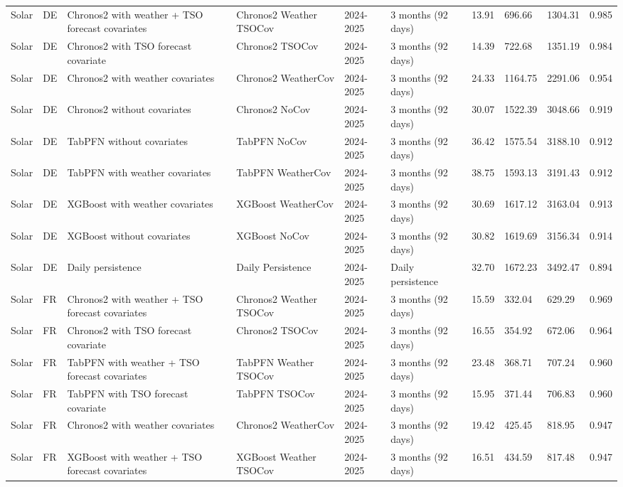\begin{longtable}{llllllllll}
Solar & DE & Chronos2 with weather + TSO forecast covariates & Chronos2 Weather TSOCov & 2024-2025 & 3 months (92 days) & 13.91 & 696.66 & 1304.31 & 0.985 \\
Solar & DE & Chronos2 with TSO forecast covariate & Chronos2 TSOCov & 2024-2025 & 3 months (92 days) & 14.39 & 722.68 & 1351.19 & 0.984 \\
Solar & DE & Chronos2 with weather covariates & Chronos2 WeatherCov & 2024-2025 & 3 months (92 days) & 24.33 & 1164.75 & 2291.06 & 0.954 \\
Solar & DE & Chronos2 without covariates & Chronos2 NoCov & 2024-2025 & 3 months (92 days) & 30.07 & 1522.39 & 3048.66 & 0.919 \\
Solar & DE & TabPFN without covariates & TabPFN NoCov & 2024-2025 & 3 months (92 days) & 36.42 & 1575.54 & 3188.10 & 0.912 \\
Solar & DE & TabPFN with weather covariates & TabPFN WeatherCov & 2024-2025 & 3 months (92 days) & 38.75 & 1593.13 & 3191.43 & 0.912 \\
Solar & DE & XGBoost with weather covariates & XGBoost WeatherCov & 2024-2025 & 3 months (92 days) & 30.69 & 1617.12 & 3163.04 & 0.913 \\
Solar & DE & XGBoost without covariates & XGBoost NoCov & 2024-2025 & 3 months (92 days) & 30.82 & 1619.69 & 3156.34 & 0.914 \\
Solar & DE & Daily persistence & Daily Persistence & 2024-2025 & Daily persistence & 32.70 & 1672.23 & 3492.47 & 0.894 \\
Solar & FR & Chronos2 with weather + TSO forecast covariates & Chronos2 Weather TSOCov & 2024-2025 & 3 months (92 days) & 15.59 & 332.04 & 629.29 & 0.969 \\
Solar & FR & Chronos2 with TSO forecast covariate & Chronos2 TSOCov & 2024-2025 & 3 months (92 days) & 16.55 & 354.92 & 672.06 & 0.964 \\
Solar & FR & TabPFN with weather + TSO forecast covariates & TabPFN Weather TSOCov & 2024-2025 & 3 months (92 days) & 23.48 & 368.71 & 707.24 & 0.960 \\
Solar & FR & TabPFN with TSO forecast covariate & TabPFN TSOCov & 2024-2025 & 3 months (92 days) & 15.95 & 371.44 & 706.83 & 0.960 \\
Solar & FR & Chronos2 with weather covariates & Chronos2 WeatherCov & 2024-2025 & 3 months (92 days) & 19.42 & 425.45 & 818.95 & 0.947 \\
Solar & FR & XGBoost with weather + TSO forecast covariates & XGBoost Weather TSOCov & 2024-2025 & 3 months (92 days) & 16.51 & 434.59 & 817.48 & 0.947 \\

\end{longtable}
